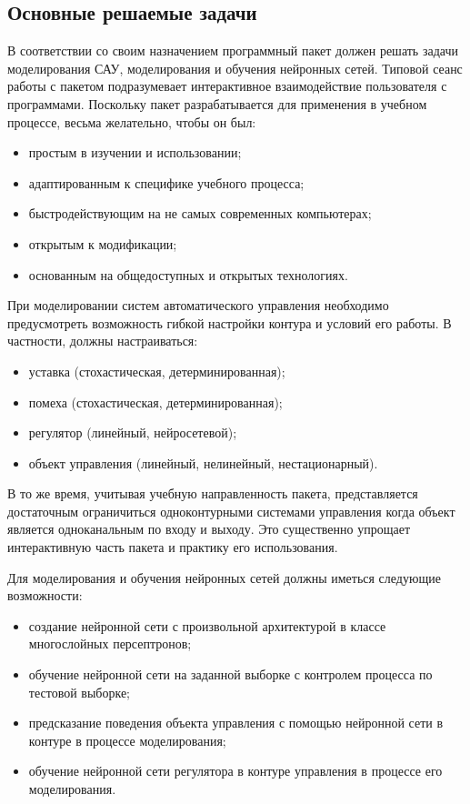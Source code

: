 
\subsection{Основные решаемые задачи}\label{main_tasks}

В соответствии со своим назначением программный пакет должен решать
задачи моделирования САУ, моделирования и обучения нейронных сетей.
Типовой сеанс работы с пакетом подразумевает интерактивное
взаимодействие пользователя с программами.  Поскольку пакет
разрабатывается для применения в учебном процессе, весьма желательно,
чтобы он был:
\begin{itemize}
\item простым в изучении и использовании;
\item адаптированным к специфике учебного процесса;
\item быстродействующим на не самых современных компьютерах;
\item открытым к модификации;
\item основанным на общедоступных и открытых технологиях.
\end{itemize}

При моделировании систем автоматического управления необходимо
предусмотреть возможность гибкой настройки контура и условий его
работы.  В частности, должны настраиваться:
\begin{itemize}
\item уставка (стохастическая, детерминированная);
\item помеха (стохастическая, детерминированная);
\item регулятор (линейный, нейросетевой);
\item объект управления (линейный, нелинейный, нестационарный).
\end{itemize}


В то же время, учитывая учебную направленность пакета, представляется
достаточным ограничиться одноконтурными системами управления когда
объект является одноканальным по входу и выходу.  Это существенно
упрощает интерактивную часть пакета и практику его использования.

Для моделирования и обучения нейронных сетей должны иметься следующие
возможности:
\begin{itemize}
\item создание нейронной сети с произвольной архитектурой в классе
  многослойных персептронов;
\item обучение нейронной сети на заданной выборке с контролем процесса
  по тестовой выборке;
\item предсказание поведения объекта управления с помощью нейронной
  сети в контуре в процессе моделирования;
\item обучение нейронной сети регулятора в контуре управления в
  процессе его моделирования.
\end{itemize}

